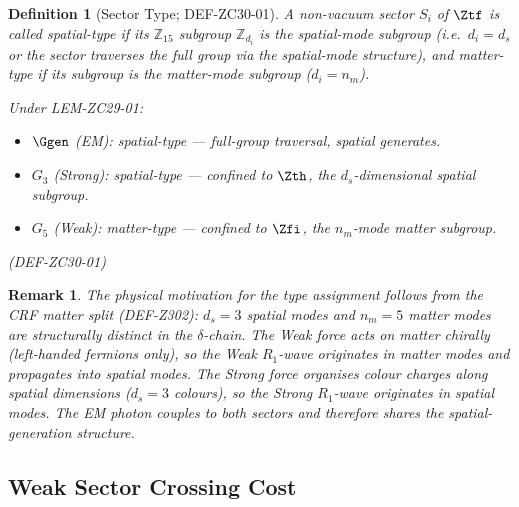 \documentclass[12pt, a4paper]{article}
\newtheorem{definition}{Definition}[section]
\newtheorem{remark}{Remark}[section]
\begin{document}
\begin{definition}[Sector Type; DEF-ZC30-01]
\label{zc30:def:type}
A non-vacuum sector $S_i$ of $\Ztf$ is called
\emph{spatial-type} if its $\mathbb{Z}_{15}$ subgroup
$\mathbb{Z}_{d_i}$ is the spatial-mode subgroup
(i.e.\ $d_i = d_s$ or the sector traverses the full group
via the spatial-mode structure), and
\emph{matter-type} if its subgroup is the matter-mode
subgroup ($d_i = n_m$).

Under LEM-ZC29-01:
\begin{itemize}[leftmargin=*, noitemsep]
  \item $\Ggen$ (EM):
    spatial-type --- full-group traversal, spatial generates.
  \item $G_3$ (Strong):
    spatial-type --- confined to $\Zth$, the $d_s$-dimensional
    spatial subgroup.
  \item $G_5$ (Weak):
    matter-type --- confined to $\Zfi$, the $n_m$-mode
    matter subgroup.
\end{itemize}
\hfill\textup{(DEF-ZC30-01)}
\end{definition}

\begin{remark}
The physical motivation for the type assignment follows from the
CRF matter split (DEF-Z302): $d_s = 3$ spatial modes and
$n_m = 5$ matter modes are structurally distinct in the
$\delta$-chain. The Weak force acts on matter chirally (left-handed
fermions only), so the Weak $R_1$-wave originates in matter modes
and propagates into spatial modes. The Strong force organises colour
charges along spatial dimensions ($d_s = 3$ colours), so the Strong
$R_1$-wave originates in spatial modes. The EM photon couples to both
sectors and therefore shares the spatial-generation structure.
\end{remark}

\subsection{Weak Sector Crossing Cost}
\label{zc30:sec:weak}
\end{document}

